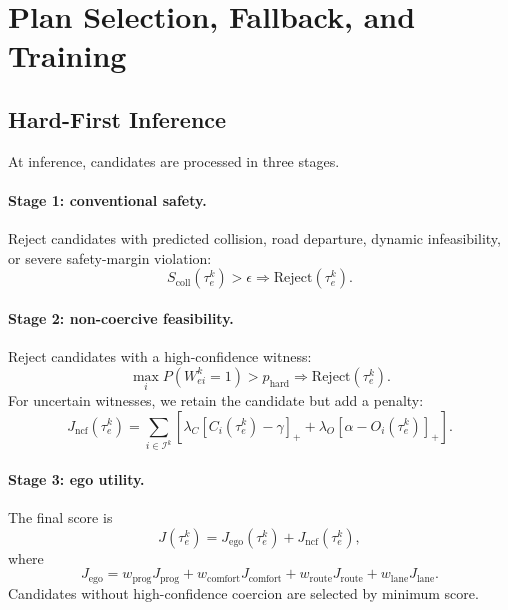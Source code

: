 \documentclass[10pt]{article}
\begin{document}
\section{Plan Selection, Fallback, and Training}
\label{app:selection_training}

\subsection{Hard-First Inference}
\label{app:hard_first}

At inference, candidates are processed in three stages.

\paragraph{Stage 1: conventional safety.}
Reject candidates with predicted collision, road departure, dynamic infeasibility, or severe safety-margin violation:
\begin{equation}
    S_{\mathrm{coll}}(\tau^k_e)>\epsilon
    \Rightarrow
    \mathrm{Reject}(\tau^k_e).
\end{equation}

\paragraph{Stage 2: non-coercive feasibility.}
Reject candidates with a high-confidence witness:
\begin{equation}
    \max_i
    P(W^k_{ei}=1)
    >
    p_{\mathrm{hard}}
    \Rightarrow
    \mathrm{Reject}(\tau^k_e).
\end{equation}
For uncertain witnesses, we retain the candidate but add a penalty:
\begin{equation}
    J_{\mathrm{ncf}}(\tau^k_e)
    =
    \sum_{i\in\mathcal{I}^k}
    \left[
    \lambda_C [C_i(\tau^k_e)-\gamma]_+
    +
    \lambda_O [\alpha-O_i(\tau^k_e)]_+
    \right].
\end{equation}

\paragraph{Stage 3: ego utility.}
The final score is
\begin{equation}
    J(\tau^k_e)
    =
    J_{\mathrm{ego}}(\tau^k_e)
    +
    J_{\mathrm{ncf}}(\tau^k_e),
\end{equation}
where
\begin{equation}
    J_{\mathrm{ego}}
    =
    w_{\mathrm{prog}}J_{\mathrm{prog}}
    +
    w_{\mathrm{comfort}}J_{\mathrm{comfort}}
    +
    w_{\mathrm{route}}J_{\mathrm{route}}
    +
    w_{\mathrm{lane}}J_{\mathrm{lane}} .
\end{equation}
Candidates without high-confidence coercion are selected by minimum score.
\end{document}
